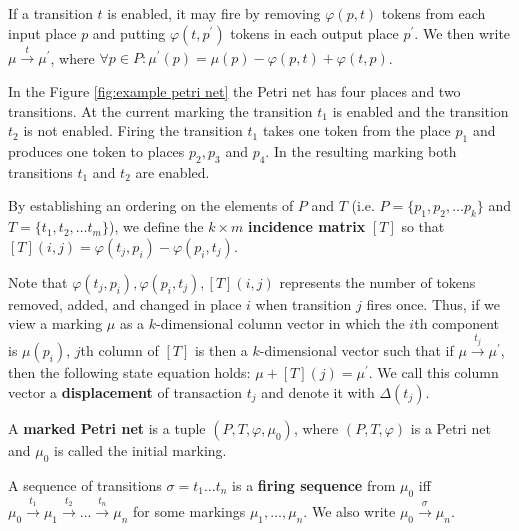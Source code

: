 If a transition $t$ is enabled, it may fire by removing $\varphi(p,t)$ tokens from each input place $p$ and putting $\varphi(t,p^\prime)$ tokens in each output place $p^\prime$. We then write $\mu\xrightarrow{t} \mu^\prime$, where $\forall p\in P: \mu^\prime(p) = \mu(p)-\varphi(p,t)+\varphi(t,p)$.

\begin{example}
  In the Figure \ref{fig:example petri net} the Petri net has four places and two transitions. At the current marking the transition $t_1$ is enabled and the transition $t_2$ is not enabled. Firing the transition $t_1$ takes one token from the place $p_1$ and produces one token to places $p_2, p_3$ and $p_4$. In the resulting marking both transitions $t_1$ and $t_2$ are enabled.
\end{example}

\begin{definition}
  By establishing an ordering on the elements of $P$ and $T$ (i.e. $P=\{p_1, p_2, \dots p_k\}$ and $T=\{t_1, t_2, \dots t_m\}$), we define the $k\times m$  {\bf incidence matrix} $[T]$ so that $[T](i,j) = \varphi(t_j, p_i) - \varphi(p_i, t_j)$. 
\end{definition}

Note that $\varphi(t_j, p_i), \varphi(p_i, t_j), [T](i,j)$ represents the number of tokens removed, added, and changed in place $i$ when transition $j$ fires once. Thus, if we view a marking $\mu$ as a $k$-dimensional column vector in which the $i$th component is $\mu(p_i)$, $j$th column of $[T]$ is then a $k$-dimensional vector such that if $\mu\xrightarrow{t_j} \mu^\prime$, then the following state equation holds: $\mu + [T](j) = \mu^\prime$. We call this column vector a {\bf displacement} of transaction $t_j$ and denote it with $\Delta(t_j)$.

\begin{definition}
  A  {\bf marked Petri net} is a tuple $(P,T,\varphi,\mu_0)$, where $(P,T,\varphi)$ is a Petri net and $\mu_0$ is called the initial marking.
\end{definition}

\begin{definition}
  A sequence of transitions $\sigma = t_1\ldots t_n$ is a {\bf firing sequence} from $\mu_0$ iff $\mu_0\xrightarrow{t_1}\mu_1\xrightarrow{t_2}\ldots\xrightarrow{t_n}\mu_n$ for some markings $\mu_1,\ldots,\mu_n$. We also write $\mu_0\xrightarrow{\sigma}\mu_n$.
\end{definition}

